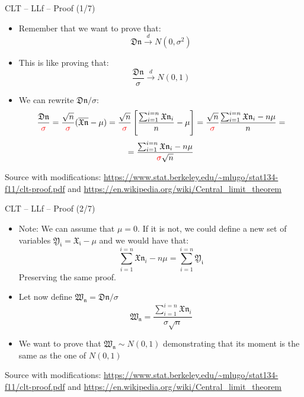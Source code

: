 \documentclass{beamer}
\begin{document}
\begin{frame}
{\centerline{CLT -- LLf -- Proof (1/7)}}


\begin{itemize}
\item Remember that we want to prove that:
$$\mathfrak{Dn} \xrightarrow{d} N(0,\sigma^2)$$
\item This is like proving that:
$$\frac{\mathfrak{Dn}}{\sigma} \xrightarrow{d} N(0,1)$$
\item We can rewrite $\mathfrak{Dn}/\sigma$:
$$\frac{\mathfrak{Dn}}{\textcolor{red}{\sigma}} = \frac{\sqrt{n}}{\textcolor{red}{\sigma}}(\overline{\mathfrak{Xn}}-\mu) = \frac{\sqrt{n}}{\textcolor{red}{\sigma}} \left [ \frac{\sum_{i=1}^{i=n}{\mathfrak{Xn}_i}}{n} - \mu \right ]
= \frac{\sqrt{n}}{\textcolor{red}{\sigma}} \frac{\sum_{i=1}^{i=n}{\mathfrak{Xn}_i} -  n\mu}{n}  =$$
$$
= \frac{\sum_{i=1}^{i=n}{\mathfrak{Xn}_i} -  n\mu}{\textcolor{red}{\sigma}\sqrt{n}} $$

\end{itemize}

\begin{center}
\tiny 
Source with modifications: \url{https://www.stat.berkeley.edu/~mlugo/stat134-f11/clt-proof.pdf} and \url{https://en.wikipedia.org/wiki/Central_limit_theorem}
\end{center}
\end{frame}


\begin{frame}
{\centerline{CLT -- LLf -- Proof (2/7)}}


\begin{itemize}
\item Note: We can assume that $\mu=0$. If it is not, we could define a new set of variables $\mathfrak{Y_i} = \mathfrak{X_i} - \mu$ and we would have that:
$$\sum_{i=1}^{i=n}\mathfrak{Xn}_i -  n\mu = \sum_{i=1}^{i=n} \mathfrak{Y_i}$$
Preserving the same proof.
\item Let now define $\mathfrak{W_n} = \mathfrak{Dn}/\sigma$
$$\mathfrak{W_n}= \frac{\sum_{i=1}^{i=n}{\mathfrak{Xn}_i} }{\sigma\sqrt{n}} $$
\item We want to prove that $\mathfrak{W_n} \sim N(0,1)$ demonstrating that its moment is the same as the one of $N(0,1)$
\end{itemize}

\begin{center}
\tiny 
Source with modifications: \url{https://www.stat.berkeley.edu/~mlugo/stat134-f11/clt-proof.pdf} and \url{https://en.wikipedia.org/wiki/Central_limit_theorem}
\end{center}
\end{frame}
\end{document}
